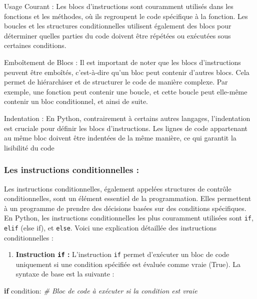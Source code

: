 \documentclass[11pt]{article}
\providecommand{\tightlist}{%
      \setlength{\itemsep}{0pt}\setlength{\parskip}{0pt}}
\newenvironment{Shaded}{}{}
\newcommand{\CommentTok}[1]{\textcolor[rgb]{0.38,0.63,0.69}{\textit{{#1}}}}
\newcommand{\NormalTok}[1]{{#1}}
\newcommand{\ControlFlowTok}[1]{\textcolor[rgb]{0.00,0.44,0.13}{\textbf{{#1}}}}
\begin{document}
Usage Courant : Les blocs d'instructions sont couramment utilisés dans
les fonctions et les méthodes, où ils regroupent le code spécifique à la
fonction. Les boucles et les structures conditionnelles utilisent
également des blocs pour déterminer quelles parties du code doivent être
répétées ou exécutées sous certaines conditions.

Emboîtement de Blocs : Il est important de noter que les blocs
d'instructions peuvent être emboîtés, c'est-à-dire qu'un bloc peut
contenir d'autres blocs. Cela permet de hiérarchiser et de structurer le
code de manière complexe. Par exemple, une fonction peut contenir une
boucle, et cette boucle peut elle-même contenir un bloc conditionnel, et
ainsi de suite.

Indentation : En Python, contrairement à certains autres langages,
l'indentation est cruciale pour définir les blocs d'instructions. Les
lignes de code appartenant au même bloc doivent être indentées de la
même manière, ce qui garantit la lisibilité du code

    \hypertarget{les-instructions-conditionnelles}{%
\subsubsection{Les instructions conditionnelles
:}\label{les-instructions-conditionnelles}}

Les instructions conditionnelles, également appelées structures de
contrôle conditionnelles, sont un élément essentiel de la programmation.
Elles permettent à un programme de prendre des décisions basées sur des
conditions spécifiques. En Python, les instructions conditionnelles les
plus couramment utilisées sont \texttt{if}, \texttt{elif} (else if), et
\texttt{else}. Voici une explication détaillée des instructions
conditionnelles :

\begin{enumerate}
\def\labelenumi{\arabic{enumi}.}
\tightlist
\item
  \textbf{Instruction \texttt{if} :} L'instruction \texttt{if} permet
  d'exécuter un bloc de code uniquement si une condition spécifiée est
  évaluée comme vraie (True). La syntaxe de base est la suivante :
\end{enumerate}

\begin{Shaded}
\begin{Highlighting}[]
   \ControlFlowTok{if}\NormalTok{ condition:}
       \CommentTok{\# Bloc de code à exécuter si la condition est vraie}
\end{Highlighting}
\end{Shaded}
\end{document}
